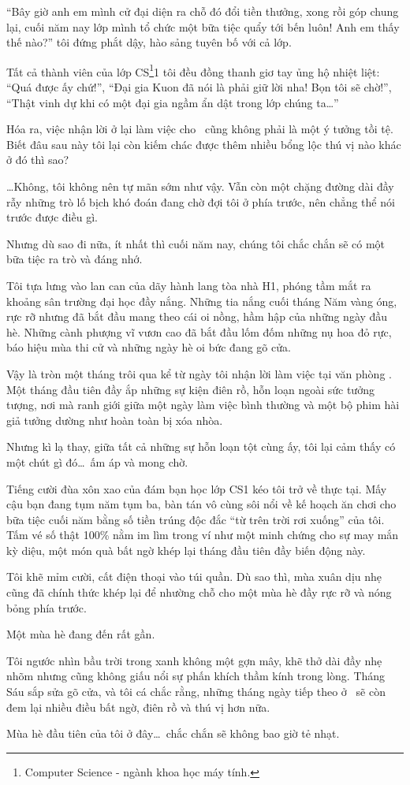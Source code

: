 \documentclass[../main.tex]{subfiles}
\begin{document}
``Bây giờ anh em mình cử đại diện ra chỗ đó đổi tiền thưởng, xong rồi góp chung lại, cuối năm nay lớp mình tổ chức một bữa tiệc quẩy tới bến luôn! Anh em thấy thế nào?'' tôi đứng phắt dậy, hào sảng tuyên bố với cả lớp.

Tất cả thành viên của lớp CS\footnote{Computer Science - ngành khoa học máy tính.}1 tôi đều đồng thanh giơ tay ủng hộ nhiệt liệt: ``Quá được ấy chứ!'', ``Đại gia Kuon đã nói là phải giữ lời nha! Bọn tôi sẽ chờ!'', ``Thật vinh dự khi có một đại gia ngầm ẩn dật trong lớp chúng ta\dots''

Hóa ra, việc nhận lời ở lại làm việc cho \hll\ cũng không phải là một ý tưởng tồi tệ. Biết đâu sau này tôi lại còn kiếm chác được thêm nhiều bổng lộc thú vị nào khác ở đó thì sao?

\dots Không, tôi không nên tự mãn sớm như vậy. Vẫn còn một chặng đường dài đầy rẫy những trò lố bịch khó đoán đang chờ đợi tôi ở phía trước, nên chẳng thể nói trước được điều gì.

Nhưng dù sao đi nữa, ít nhất thì cuối năm nay, chúng tôi chắc chắn sẽ có một bữa tiệc ra trò và đáng nhớ.

Tôi tựa lưng vào lan can của dãy hành lang tòa nhà H1, phóng tầm mắt ra khoảng sân trường đại học đầy nắng. Những tia nắng cuối tháng Năm vàng óng, rực rỡ nhưng đã bắt đầu mang theo cái oi nồng, hầm hập của những ngày đầu hè. Những cành phượng vĩ vươn cao đã bắt đầu lốm đốm những nụ hoa đỏ rực, báo hiệu mùa thi cử và những ngày hè oi bức đang gõ cửa.

Vậy là tròn một tháng trôi qua kể từ ngày tôi nhận lời làm việc tại văn phòng \hll. Một tháng đầu tiên đầy ắp những sự kiện điên rồ, hỗn loạn ngoài sức tưởng tượng, nơi mà ranh giới giữa một ngày làm việc bình thường và một bộ phim hài giả tưởng dường như hoàn toàn bị xóa nhòa.

Nhưng kì lạ thay, giữa tất cả những sự hỗn loạn tột cùng ấy, tôi lại cảm thấy có một chút gì đó\dots\ ấm áp và mong chờ.

Tiếng cười đùa xôn xao của đám bạn học lớp CS1 kéo tôi trở về thực tại. Mấy cậu bạn đang tụm năm tụm ba, bàn tán vô cùng sôi nổi về kế hoạch ăn chơi cho bữa tiệc cuối năm bằng số tiền trúng độc đắc ``từ trên trời rơi xuống'' của tôi. Tấm vé số thật 100\% nằm im lìm trong ví như một minh chứng cho sự may mắn kỳ diệu, một món quà bất ngờ khép lại tháng đầu tiên đầy biến động này.

Tôi khẽ mỉm cười, cất điện thoại vào túi quần. Dù sao thì, mùa xuân dịu nhẹ cũng đã chính thức khép lại để nhường chỗ cho một mùa hè đầy rực rỡ và nóng bỏng phía trước.

Một mùa hè đang đến rất gần.

Tôi ngước nhìn bầu trời trong xanh không một gợn mây, khẽ thở dài đầy nhẹ nhõm nhưng cũng không giấu nổi sự phấn khích thầm kính trong lòng. Tháng Sáu sắp sửa gõ cửa, và tôi cá chắc rằng, những tháng ngày tiếp theo ở \hll\ sẽ còn đem lại nhiều điều bất ngờ, điên rồ và thú vị hơn nữa.

Mùa hè đầu tiên của tôi ở đây\dots\ chắc chắn sẽ không bao giờ tẻ nhạt.
\end{document}
